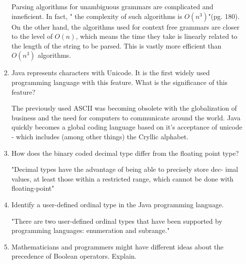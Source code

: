 \begin{enumerate}
\begin{answer}
    Parsing algorithms for unambiguous grammars are complicated and
    inneficient. In fact, " the complexity of such algorithms is
    $O(n^3)$"(pg. 180). On the other hand, the algorithms used for
    context free grammars are closer to the level of $O(n)$, which means
    the time they take is linearly related to the length of the string
    to be parsed. This is vastly more efficient than $O(n^3)$
    algorithms.

    \end{answer}

  \item Java represents characters with Unicode. It is the first
    widely used programming language with this feature. What is the
    significance of this feature?

  \begin{answer}

    The previously used ASCII was becoming obsolete with the
    globalization of business and the need for computers to
    communicate around the world. Java quickly becomes a global coding
    language based on it's acceptance of unicode - which includes
    (among other things) the Cryllic alphabet.

    \end{answer}

  \item How does the binary coded decimal type differ from the
    floating point type?

  \begin{answer}

    "Decimal types have the advantage of being able to precisely store
    dec- imal values, at least those within a restricted range, which
    cannot be done with floating-point"

    \end{answer}

  \item Identify a user-defined ordinal type in the Java programming
    language.

  \begin{answer}

    "There are two user-defined ordinal types that have been supported
    by programming languages: enumeration and subrange."

    \end{answer}

  \item Mathematicians and programmers might have different ideas
    about the precedence of Boolean operators. Explain.


\end{enumerate}
